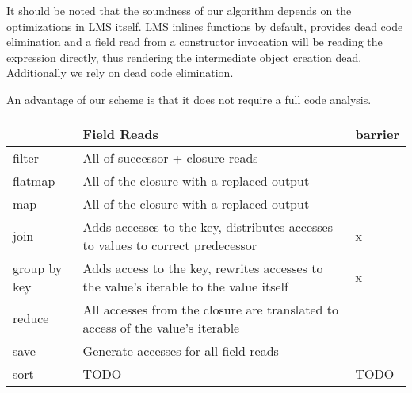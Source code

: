 \bigskip

It should be noted that the soundness of our algorithm depends on the optimizations in LMS itself. LMS inlines functions
by default, provides dead code elimination and a field read from a constructor invocation will be reading the
expression directly, thus rendering the intermediate object creation dead. Additionally we rely on dead code
elimination. 

An advantage of our scheme is that it does not require a full code analysis.



\begin{table}
    \begin{tabular}{l|l|l}
    
        ~            & Field Reads                                                                           & barrier \\ \hline
        filter       & All of successor + closure reads                                                      & ~       \\ 
        flatmap      & All of the closure with a replaced output                                             & ~       \\ 
        map          & All of the closure with a replaced output                                             & ~       \\ 
        join         & Adds accesses to the key, distributes accesses to values to correct predecessor       & x       \\ 
        group by key & Adds access to the key, rewrites accesses to the value's iterable to the value itself & x       \\ 
        reduce       & All accesses from the closure are translated to access of the value's iterable        & ~       \\ 
        save         & Generate accesses for all field reads                                                 & ~       \\ 
        sort         & TODO                                                                                  & TODO    \\ 


    \end{tabular}
\end{table}

\label{sec:field-reduction}
